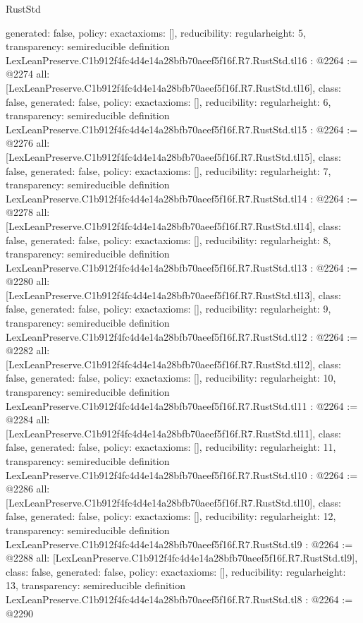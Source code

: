 \begin{lexlean}{RustStd}
\begin{coremodule}
{  generated: false,
  policy: exact{axioms: []},
  reducibility: regular{height: 5},
  transparency: semireducible
}
definition LexLeanPreserve.C1b912f4fc4d4e14a28bfb70aeef5f16f.R7.RustStd.tl16 : @2264 := @2274 {
  all: [LexLeanPreserve.C1b912f4fc4d4e14a28bfb70aeef5f16f.R7.RustStd.tl16],
  class: false,
  generated: false,
  policy: exact{axioms: []},
  reducibility: regular{height: 6},
  transparency: semireducible
}
definition LexLeanPreserve.C1b912f4fc4d4e14a28bfb70aeef5f16f.R7.RustStd.tl15 : @2264 := @2276 {
  all: [LexLeanPreserve.C1b912f4fc4d4e14a28bfb70aeef5f16f.R7.RustStd.tl15],
  class: false,
  generated: false,
  policy: exact{axioms: []},
  reducibility: regular{height: 7},
  transparency: semireducible
}
definition LexLeanPreserve.C1b912f4fc4d4e14a28bfb70aeef5f16f.R7.RustStd.tl14 : @2264 := @2278 {
  all: [LexLeanPreserve.C1b912f4fc4d4e14a28bfb70aeef5f16f.R7.RustStd.tl14],
  class: false,
  generated: false,
  policy: exact{axioms: []},
  reducibility: regular{height: 8},
  transparency: semireducible
}
definition LexLeanPreserve.C1b912f4fc4d4e14a28bfb70aeef5f16f.R7.RustStd.tl13 : @2264 := @2280 {
  all: [LexLeanPreserve.C1b912f4fc4d4e14a28bfb70aeef5f16f.R7.RustStd.tl13],
  class: false,
  generated: false,
  policy: exact{axioms: []},
  reducibility: regular{height: 9},
  transparency: semireducible
}
definition LexLeanPreserve.C1b912f4fc4d4e14a28bfb70aeef5f16f.R7.RustStd.tl12 : @2264 := @2282 {
  all: [LexLeanPreserve.C1b912f4fc4d4e14a28bfb70aeef5f16f.R7.RustStd.tl12],
  class: false,
  generated: false,
  policy: exact{axioms: []},
  reducibility: regular{height: 10},
  transparency: semireducible
}
definition LexLeanPreserve.C1b912f4fc4d4e14a28bfb70aeef5f16f.R7.RustStd.tl11 : @2264 := @2284 {
  all: [LexLeanPreserve.C1b912f4fc4d4e14a28bfb70aeef5f16f.R7.RustStd.tl11],
  class: false,
  generated: false,
  policy: exact{axioms: []},
  reducibility: regular{height: 11},
  transparency: semireducible
}
definition LexLeanPreserve.C1b912f4fc4d4e14a28bfb70aeef5f16f.R7.RustStd.tl10 : @2264 := @2286 {
  all: [LexLeanPreserve.C1b912f4fc4d4e14a28bfb70aeef5f16f.R7.RustStd.tl10],
  class: false,
  generated: false,
  policy: exact{axioms: []},
  reducibility: regular{height: 12},
  transparency: semireducible
}
definition LexLeanPreserve.C1b912f4fc4d4e14a28bfb70aeef5f16f.R7.RustStd.tl9 : @2264 := @2288 {
  all: [LexLeanPreserve.C1b912f4fc4d4e14a28bfb70aeef5f16f.R7.RustStd.tl9],
  class: false,
  generated: false,
  policy: exact{axioms: []},
  reducibility: regular{height: 13},
  transparency: semireducible
}
definition LexLeanPreserve.C1b912f4fc4d4e14a28bfb70aeef5f16f.R7.RustStd.tl8 : @2264 := @2290 {
}
\end{coremodule}
\end{lexlean}

